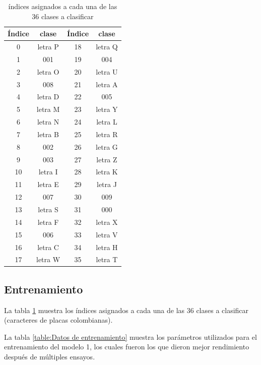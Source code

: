 \begin{table}[H]
\begin{center}
\begin{tabular}{||c|c||c|c||}
\hline
\hline
 Índice & clase & Índice & clase  \\
\hline
0 & letra P & 18 & letra Q\\ \hline
1 & 001 & 19 & 004\\ \hline
2 & letra O & 20 & letra U\\ \hline
3 & 008  & 21 & letra A\\ \hline
4 & letra D & 22 & 005\\ \hline
5 & letra M & 23 & letra Y\\ \hline
6 & letra N & 24 & letra L\\ \hline
7 & letra B & 25 & letra R\\ \hline
8 & 002 & 26 & letra G\\ \hline
9 & 003 & 27 & letra Z\\ \hline
10 & letra I & 28 & letra K\\ \hline
11 & letra E & 29 & letra J\\ \hline
12 & 007 & 30 & 009\\ \hline
13 & letra S & 31 & 000\\ \hline
14 & letra F & 32 & letra X\\ \hline
15 & 006 & 33 & letra V\\ \hline
16 & letra C & 34 & letra H\\ \hline
17 & letra W & 35 & letra T\\ \hline \hline

\hline
\end{tabular}
\caption{\label{table:indices_data segmentada}índices asignados a cada una de las 36 clases a clasificar}
\end{center}
\end{table}


\subsection{Entrenamiento}\label{sec:entreModelo1}

La tabla \ref{table:indices_data segmentada} muestra los índices asignados a cada una de las 36 clases a clasificar (caracteres de placas colombianas).


La tabla \ref{table:Datos de entrenamiento} muestra los parámetros utilizados para el entrenamiento del modelo 1, los cuales fueron los que dieron mejor rendimiento después de múltiples ensayos.

